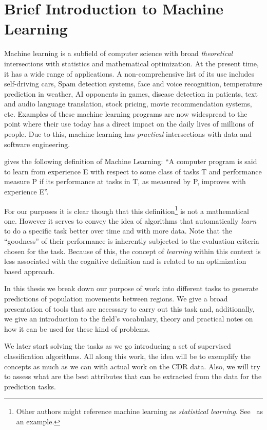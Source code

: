 \section{Brief Introduction to Machine Learning}

Machine learning is a subfield of computer science with broad \textit{theoretical} intersections with statistics and mathematical optimization. 
At the present time, it has a wide range of applications. 
A non-comprehensive list of its use includes self-driving cars, Spam detection systems, face and voice recognition, temperature prediction in weather, AI opponents in games, disease detection in patients, text and audio language translation, stock pricing, movie recommendation systems, etc. 
Examples of these machine learning programs are now widespread to the point where their use today has a direct impact on the daily lives of millions of people. 
Due to this, machine learning has \textit{practical} intersections with data and software engineering.


\cite{Mitchell-MLearning} gives the following definition of Machine Learning:
``A computer program is said to learn from experience E with respect to some class of tasks T and performance measure P if its performance at tasks in T, as measured by P, improves with experience E''.
 
For our purposes it is clear though that this definition\footnote{Other authors might reference machine learning as \textit{statistical learning}. See~\cite{hastie-elemstatslearn} as an example.} is not a mathematical one. 
However it serves to convey the idea of algorithms that automatically \textit{learn} to do a specific task better over time and with more data. 
Note that the ``goodness'' of their performance is inherently subjected to the evaluation criteria chosen for the task. 
Because of this, the concept of \textit{learning} within this context is less associated with the cognitive definition and is related to an optimization based approach.

In this thesis we break down our purpose of work into different tasks to generate predictions of population movements between regions.
We give a broad presentation of tools that are necessary to carry out this task and, additionally, we give an introduction to the field's vocabulary, theory and practical notes on how it can be used for these kind of problems.
 
We later start solving the tasks as we go introducing a set of supervised classification algorithms.
All along this work, the idea will be to exemplify the concepts as much as we can with actual work on the CDR data.
Also, we will try to assess what are the best attributes that can be extracted from the data for the prediction tasks. 
 
